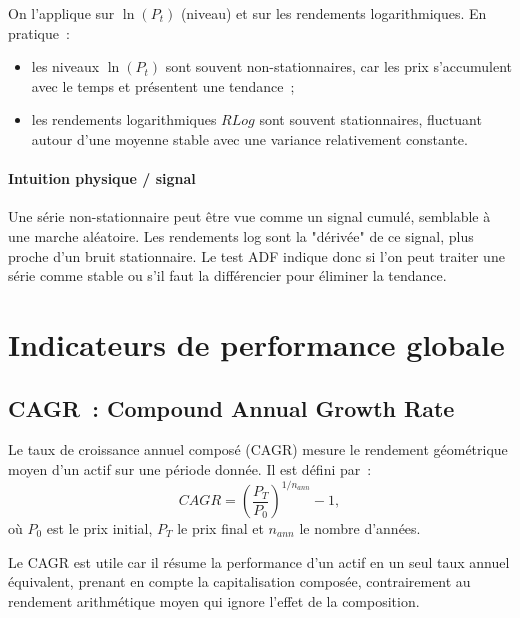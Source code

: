 \documentclass[12pt,a4paper]{article}
\begin{document}
On l'applique sur $\ln(P_t)$ (niveau) et sur les rendements
logarithmiques. En pratique~:
\begin{itemize}
  \item les niveaux $\ln(P_t)$ sont souvent non-stationnaires,
        car les prix s'accumulent avec le temps et présentent une
        tendance~;
  \item les rendements logarithmiques $RLog$ sont souvent
        stationnaires, fluctuant autour d'une moyenne stable avec
 une variance relativement constante.
\end{itemize}

\paragraph{Intuition physique / signal}

Une série non-stationnaire peut être vue comme un signal cumulé,
semblable à une marche aléatoire. Les rendements log sont la "dérivée"
de ce signal, plus proche d'un bruit stationnaire. Le test ADF
indique donc si l'on peut traiter une série comme stable ou s'il
faut la différencier pour éliminer la tendance.

\section{Indicateurs de performance globale}

\subsection{CAGR~: Compound Annual Growth Rate}

Le taux de croissance annuel composé (CAGR) mesure le rendement géométrique moyen 
d'un actif sur une période donnée. Il est défini par~:
\begin{equation}
    CAGR = \left(\frac{P_T}{P_0}\right)^{1/n_{ann}} - 1,
\end{equation}
où $P_0$ est le prix initial, $P_T$ le prix final et $n_{ann}$ le nombre d'années.

Le CAGR est utile car il résume la performance d'un actif en un seul taux annuel 
équivalent, prenant en compte la capitalisation composée, contrairement au rendement 
arithmétique moyen qui ignore l'effet de la composition.
\end{document}
